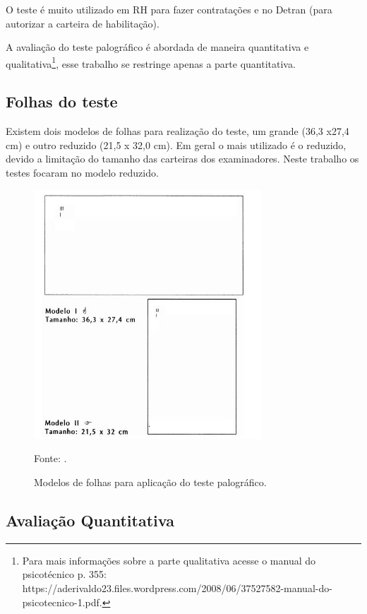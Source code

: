 O teste é muito utilizado em RH para fazer contratações  e no Detran (para autorizar a carteira de habilitação). \cite{kenoby2017}

A avaliação do teste palográfico é abordada de maneira quantitativa e qualitativa\footnote{ Para mais informações sobre a parte qualitativa acesse o manual do psicotécnico p. 355: https://aderivaldo23.files.wordpress.com/2008/06/37527582-manual-do-psicotecnico-1.pdf.}, esse trabalho se restringe apenas a parte quantitativa.

\subsection{Folhas do teste}
\label{sec:folhasTeste}

Existem dois modelos de folhas para realização do teste, um grande (36,3 x27,4 cm) e outro reduzido (21,5 x 32,0 cm). Em geral o mais utilizado é o reduzido, devido a limitação do tamanho das carteiras dos examinadores. Neste trabalho os testes focaram no modelo reduzido.\cite{passetestepalografico2013}


\begin{figure}[H]
 \centering
 \includegraphics[width=0.76\textwidth]{./fig/palos/folhas}
 \caption{Modelos de folhas para aplicação do teste palográfico.}
  Fonte: \cite{passetestepalografico2013}.
 \label{fig:folhas}
\end{figure}


\subsection{Avaliação Quantitativa}
\label{sub:avaquali}


